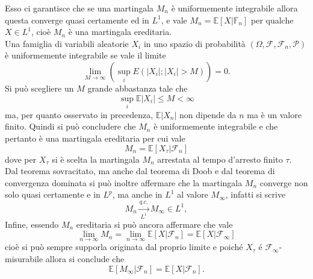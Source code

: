 \documentclass[12pt]{homework}
\begin{document}
\begin{enumerate}
Esso ci garantisce che se una martingala $M_n$ è uniformemente integrabile allora questa converge quasi certamente ed in $L^1$, e vale $M_n = \mathbb{E} \left[X \lvert \mathbb{F}_n \right]$ per qualche $X \in L^1$, cioè $M_n$ è una martingala ereditaria. \\Una famiglia di variabili aleatorie $X_i$ in uno spazio di probabilità $\left(\Omega, \mathcal{F}, \mathcal{F}_n, \mathcal{P}\right)$ è uniformemente integrabile se vale il limite 
   \[\lim_{M\rightarrow \infty} \left(\sup_i E(\lvert X_i\lvert; \lvert X_i\lvert > M)\right) = 0.\]
Si può scegliere un $M$ grande abbastanza tale che 
\[\sup_i \mathbb{E}\lvert X_i\lvert \leq M < \infty \]
ma, per quanto osservato in precedenza, $\mathbb{E}\lvert X_n \lvert$ non dipende da $n$ ma è un valore finito. Quindi si può concludere che $M_n$ è uniformemente integrabile e che pertanto è una martingala ereditaria per cui vale \[M_n = \mathbb{E}\left[X_\tau |\mathcal{F}_n\right] \] dove per $X_\tau$ si è scelta la martingala $M_n$ arrestata al tempo d'arresto finito $\tau$. \\
Dal teorema sovracitato, ma anche dal teorema di Doob e dal teorema di convergenza dominata si può inoltre affermare che la martingala $M_n$ converge non solo quasi certamente e in $L^p$, ma anche in $L^1$ al valore $M_\infty$, infatti si scrive
   \begin{equation*}
   M_{n}\xrightarrow[L^{1}]{q.c.}M_{\infty}\in L^{1},
   \end{equation*}
Infine, essendo $M_n$ ereditaria si può ancora affermare che vale \[  \lim_{n\to \infty} M_n = \lim_{n\to \infty} \mathbb{E}[X \lvert \mathcal{F}_n] =  \mathbb{E}[X\lvert\mathcal{F}_\infty]\]
cioè si può sempre supporla originata dal proprio limite e poiché $X_\tau$ é $\mathcal{F}_\infty$-misurabile allora si conclude che \[ \mathbb{E}[M_\infty\lvert\mathcal{F}_n] =  \mathbb{E}[X\lvert\mathcal{F}_n].\]
   
  \end{enumerate}
  
  
  \newpage
\end{document}
